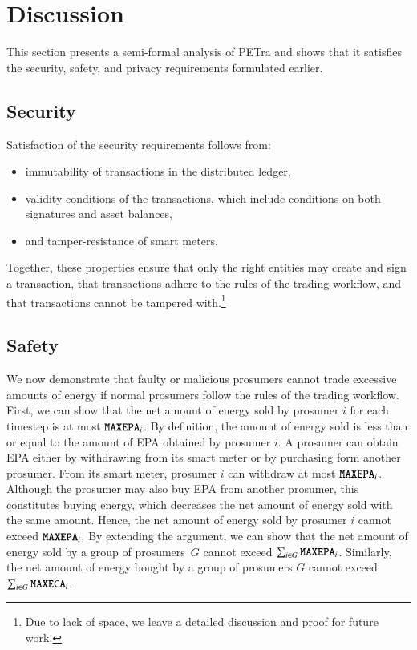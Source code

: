 \section{Discussion}
\label{sec:discussion}

This section presents a semi-formal analysis of PETra
and shows that it satisfies the security, safety, and privacy
requirements formulated earlier.

\subsection{Security}
Satisfaction of the security requirements follows from:
\begin{itemize}[noitemsep,topsep=-\parskip]
\item immutability of transactions in the distributed ledger,
\item validity conditions of the transactions, which include conditions on both signatures and asset balances,
\item and tamper-resistance of smart meters.
\end{itemize}
Together, these properties ensure that only the right entities may
create and sign a transaction, that transactions adhere to the rules
of the trading workflow, and that transactions cannot be tampered
with.\footnote{Due to lack of space, we leave a detailed discussion
  and proof for future work.}

\subsection{Safety}
We now demonstrate that faulty or malicious prosumers cannot trade
excessive amounts of energy if normal prosumers follow the rules of
the trading workflow.
%
First, we can show that the net amount of energy sold by prosumer $i$ for
each timestep is at most $\texttt{MAXEPA}_i$.  By definition, the
amount of energy sold is less than or equal to the amount of EPA
obtained by prosumer $i$.  A prosumer can obtain EPA either by
withdrawing from its smart meter or by purchasing form another
prosumer.  From its smart meter, prosumer $i$ can withdraw at most
$\texttt{MAXEPA}_i$.
Although the prosumer may also buy EPA from another prosumer, this
constitutes buying energy, which decreases the net amount of energy
sold with the same amount.
Hence, the net amount of energy sold by prosumer $i$ cannot exceed
$\texttt{MAXEPA}_i$.  By extending the argument, we can show that the net
amount of energy sold by a group of prosumers~$G$ cannot exceed
$\sum_{i \in G} \texttt{MAXEPA}_i$.  Similarly, %
the net
amount of energy bought by a group of prosumers $G$ cannot exceed
$\sum_{i \in G} \texttt{MAXECA}_i$.

